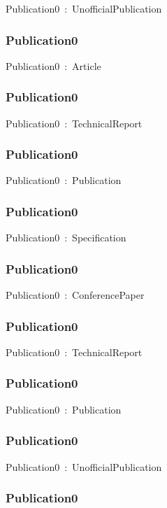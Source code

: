\documentclass{article}
\begin{document}
Publication0~:~UnofficialPublication

\subsubsection*{Publication0}

Publication0~:~Article

\subsubsection*{Publication0}

Publication0~:~TechnicalReport

\subsubsection*{Publication0}

Publication0~:~Publication

\subsubsection*{Publication0}

Publication0~:~Specification

\subsubsection*{Publication0}

Publication0~:~ConferencePaper

\subsubsection*{Publication0}

Publication0~:~TechnicalReport

\subsubsection*{Publication0}

Publication0~:~Publication

\subsubsection*{Publication0}

Publication0~:~UnofficialPublication

\subsubsection*{Publication0}
\end{document}
